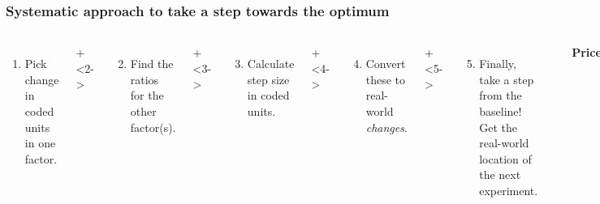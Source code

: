 \documentclass[handout,11pt,aspectratio=169,mathserif]{beamer}
\begin{document}
\begin{frame}\frametitle{Systematic approach to take a step towards the optimum}
	\begin{columns}[T]
		
			\vspace{0.1cm}
			{\tiny 
				\begin{enumerate}
					\item	Pick change in coded units in one factor.
				\end{enumerate}
			 \par}
			\onslide+<2->{
				{\tiny 
					\begin{enumerate}\setcounter{enumi}{1}
						\item	Find the ratios for the other factor(s).
					\end{enumerate}
				
				\par}
			}
			
			\vspace{0.9cm}
			\onslide+<3->{
				{\tiny 
					\begin{enumerate}\setcounter{enumi}{2}
						\item	Calculate step size in coded units.
					\end{enumerate}
				
				\par}
			}
			
			\vspace{0.4cm}
			\onslide+<4->{
				{\tiny 
					\begin{enumerate}\setcounter{enumi}{3}
						\item	Convert these to real-world \emph{changes}.
					\end{enumerate}
				
				\par}
			}
			
			\vspace{1cm}
			\onslide+<5->{
				{\tiny 
					\begin{enumerate}\setcounter{enumi}{4}
						\item	Finally, take a step from the baseline! Get the real-world location
						of the next experiment.
					\end{enumerate}
				
				\par}
			}
				
			\rule[3mm]{0.01cm}{85mm}%
			
			
			\centerline{\textbf{Price}}
			

\end{columns}
\end{frame}
\end{document}
